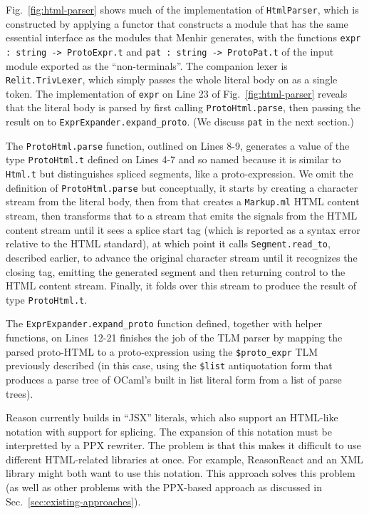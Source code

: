 \documentclass[acmsmall]{acmart}
\newcommand{\li}[1]{\lstinline[basicstyle=\ttfamily\fontsize{9pt}{1em}\selectfont]{#1}}
\begin{document}
Fig.~\ref{fig:html-parser} shows much of the implementation of \li{HtmlParser},  which is constructed by applying a functor that constructs a module that has the same essential interface as the modules that Menhir generates, with the functions \li{expr : string -> ProtoExpr.t} and \li{pat : string -> ProtoPat.t} of the input module exported as the ``non-terminals''. The companion lexer is \li{Relit.TrivLexer}, which simply passes the whole literal body on as a single token. The implementation of \li{expr} on Line 23 of Fig.~\ref{fig:html-parser} reveals that the literal body is parsed by first calling \li{ProtoHtml.parse}, then passing the result on to \li{ExprExpander.expand_proto}. (We discuss \li{pat} in the next section.)

The \li{ProtoHtml.parse} function, outlined on Lines 8-9, generates a value of the type \li{ProtoHtml.t} defined on Lines 4-7 and so named because it is similar to \li{Html.t} but distinguishes spliced segments, like a proto-expression. We omit the definition of \li{ProtoHtml.parse} but conceptually, it starts by creating a character stream from the literal body, then from that creates a \li{Markup.ml} HTML content stream, then transforms that to a stream that emits the signals from the HTML content stream until it sees a splice start tag (which is reported as a syntax error relative to the HTML standard), at which point it calls \li{Segment.read_to}, described earlier, to advance the original character stream until it recognizes the closing tag, emitting the generated segment and then returning control to the HTML content stream. Finally, it folds over this stream to produce the result of type \li{ProtoHtml.t}. 

The \li{ExprExpander.expand_proto} function defined, together with helper functions, on Lines~12-21 finishes the job of the TLM parser by mapping the parsed proto-HTML to a proto-expression using the \li{$proto_expr} TLM previously described (in this case, using the \li{$list} antiquotation form that produces a parse tree of OCaml's built in list literal form from a list of parse trees).%

Reason currently builds in ``JSX'' literals, which also support an HTML-like notation with support for splicing. The expansion of this notation must be interpretted by a PPX rewriter. The problem is that this makes it difficult to use different HTML-related libraries at once. For example, ReasonReact and an XML library might both want to use this notation. This approach solves this problem (as well as other problems with the PPX-based approach as discussed in Sec.~\ref{sec:existing-approaches}).
\end{document}
